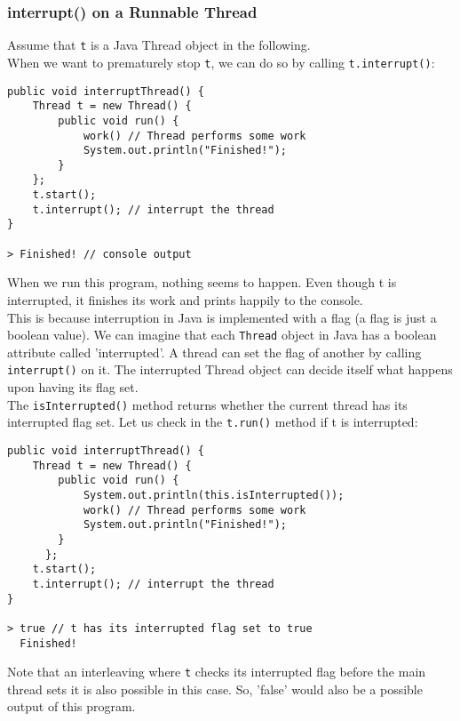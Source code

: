 \documentclass[main.tex]{subfiles}
\begin{document}
\subsubsection{interrupt() on a Runnable Thread}
Assume that \texttt{t} is a Java Thread object in the following.\\
When we want to prematurely stop \texttt{t}, we can do so by calling \texttt{t.interrupt()}:
\begin{verbatim}
public void interruptThread() {
    Thread t = new Thread() {
        public void run() {
            work() // Thread performs some work
            System.out.println("Finished!");
        }
    };
    t.start();
    t.interrupt(); // interrupt the thread
}

> Finished! // console output
\end{verbatim}
When we run this program, nothing seems to happen. Even though t is interrupted, it finishes its work and prints happily to the console.\\
This is because interruption in Java is implemented with a flag (a flag is just a boolean value). We can imagine that each \texttt{Thread} object in Java has a boolean attribute called 'interrupted'. A thread can set the flag of another by calling \texttt{interrupt()} on it. The interrupted Thread object can decide itself what happens upon having its flag set.\\
The \texttt{isInterrupted()} method returns whether the current thread has its interrupted flag set. Let us check in the \texttt{t.run()} method if t is interrupted:
\begin{verbatim}
public void interruptThread() {
    Thread t = new Thread() {
        public void run() {
            System.out.println(this.isInterrupted());
            work() // Thread performs some work
            System.out.println("Finished!");
        }
      };
    t.start();
    t.interrupt(); // interrupt the thread
}

> true // t has its interrupted flag set to true
  Finished!
\end{verbatim}
Note that an interleaving where \texttt{t} checks its interrupted flag before the main thread sets it is also possible in this case. So, 'false' would also be a possible output of this program.
\end{document}
